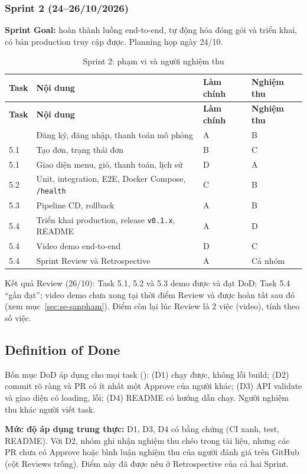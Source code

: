\documentclass[a4paper]{article}
\begin{document}
\subsubsection{Sprint 2 (24--26/10/2026)}
\textbf{Sprint Goal:} hoàn thành luồng end-to-end, tự động hóa đóng gói và triển khai, có bản production truy cập được. Planning họp ngày 24/10.
\begin{longtable}{@{}p{1cm}p{6.2cm}p{3.2cm}p{2.6cm}@{}}
\caption{Sprint 2: phạm vi và người nghiệm thu}\label{tab:sprint2}\\
\toprule \textbf{Task} & \textbf{Nội dung} & \textbf{Làm chính} & \textbf{Nghiệm thu} \\ \midrule \endfirsthead
\toprule \textbf{Task} & \textbf{Nội dung} & \textbf{Làm chính} & \textbf{Nghiệm thu} \\ \midrule \endhead
\bottomrule \endlastfoot
5.1 & Đăng ký, đăng nhập, thanh toán mô phỏng & A & B \\
5.1 & Tạo đơn, trạng thái đơn & B & C \\
5.1 & Giao diện menu, giỏ, thanh toán, lịch sử & D & A \\
5.2 & Unit, integration, E2E, Docker Compose, \texttt{/health} & C & B \\
5.3 & Pipeline CD, rollback & A & B \\
5.4 & Triển khai production, release \texttt{v0.1.x}, README & A & D \\
5.4 & Video demo end-to-end & D & C \\
5.4 & Sprint Review và Retrospective & A & Cả nhóm \\
\end{longtable}
Kết quả Review (26/10): Task 5.1, 5.2 và 5.3 demo được và đạt DoD; Task 5.4 ``gần đạt''; video demo chưa xong tại thời điểm Review và được hoàn tất sau đó (xem mục~\ref{sec:se-sanpham}). Điểm còn lại lúc Review là 2 việc (video), tính theo số việc.

\subsection{Definition of Done}\label{sec:se-dod}
Bốn mục DoD áp dụng cho mọi task (): (D1) chạy được, không lỗi build; (D2) commit rõ ràng và PR có ít nhất một Approve của người khác; (D3) API validate và giao diện có loading, lỗi; (D4) README có hướng dẫn chạy. Người nghiệm thu khác người viết task.

\textbf{Mức độ áp dụng trung thực:} D1, D3, D4 có bằng chứng (CI xanh, test, README). Với D2, nhóm ghi nhận nghiệm thu chéo trong tài liệu, nhưng các PR chưa có Approve hoặc bình luận nghiệm thu của người đánh giá trên GitHub (cột Reviews trống). Điểm này đã được nêu ở Retrospective của cả hai Sprint.
\end{document}
